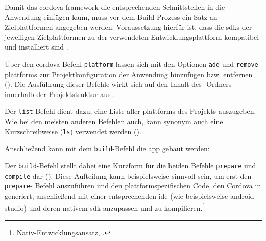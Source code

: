 {Damit das \gls{cordova}-\gls{framework} die entsprechenden Schnittstellen in die Anwendung einfügen kann, muss vor dem Build-Prozess ein Satz an Zielplattformen angegeben werden. 
Voraussetzung hierfür ist, dass die \glspl{sdk} der jeweiligen Zielplattformen zu der verwendeten Entwicklungsplattform kompatibel und installiert sind \cite{Cordova-Docs_CLI}.

Über den \gls{cordova}-Befehl \lstinline|platform| lassen sich mit den Optionen \lstinline|add| und \lstinline|remove| \glspl{plattform} zur Projektkonfiguration der Anwendung hinzufügen bzw. entfernen ().
Die Ausführung dieser Befehle wirkt sich auf den Inhalt des -Ordners innerhalb der Projektstruktur aus \cite{Cordova-Docs_CLI}.


Der \lstinline|list|-Befehl dient dazu, eine Liste aller \glspl{plattform} des Projekts auszugeben. Wie bei den meisten anderen Befehlen auch, kann synonym auch eine Kurzschreibweise (\lstinline|ls|) verwendet werden ().


Anschließend kann mit dem \lstinline|build|-Befehl die \gls{app} gebaut werden:


Der \lstinline|build|-Befehl stellt dabei eine Kurzform für die beiden Befehle \lstinline|prepare| und  \lstinline|compile| dar ().
Diese Aufteilung kann beispielsweise sinnvoll sein, um erst den \lstinline|prepare|- Befehl auszuführen und den plattformspezifischen Code, den Cordova in  generiert, anschließend mit einer entsprechenden \gls{ide} (wie beispielsweise \gls{android-studio}) und deren nativem \gls{sdk} anzupassen und zu kompilieren.\footnote{\vgl Nativ-Entwicklungsansatz, .}




}
